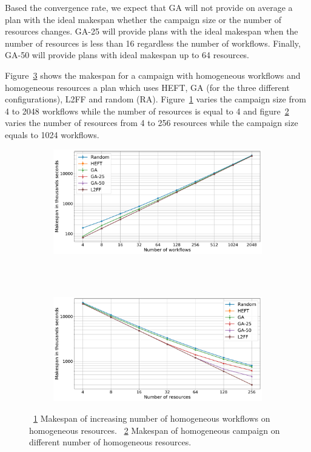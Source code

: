 Based the convergence rate, we expect that GA will not provide on average a plan with the ideal makespan whether the campaign size or the number of resources changes.
GA-25 will provide plans with the ideal makespan when the number of resources is less than 16 regardless the number of workflows.
Finally, GA-50 will provide plans with ideal makespan up to 64 resources.

Figure~\ref{fig:st_homog_analysis} shows the makespan for a campaign with homogeneous workflows and homogeneous resources a plan which uses HEFT, GA (for the three different configurations), L2FF and random (RA).
Figure~\ref{fig:StHomoCampaigns_4StHomoResources} varies the campaign size from 4 to 2048 workflows while the number of resources is equal to 4 and figure~\ref{fig:StHomoResources_StHomoCampaigns} varies the number of resources from 4 to 256 resources while the campaign size equals to 1024 workflows.

\begin{figure}[ht!]
    \centering
    \begin{subfigure}[b]{0.75\textwidth}
        \includegraphics[width=.95\textwidth]{figures/campaign/StHomoCampaigns_4StHomoResources.pdf}
        \caption{}
        \label{fig:StHomoCampaigns_4StHomoResources}
    \end{subfigure}\\
    ~ 
    \begin{subfigure}[b]{0.75\textwidth}
        \includegraphics[width=.95\textwidth]{figures/campaign/StHomoResources_StHomoCampaigns.pdf}
        \caption{}
        \label{fig:StHomoResources_StHomoCampaigns}
    \end{subfigure}
    \caption{~\ref{fig:StHomoCampaigns_4StHomoResources} Makespan of increasing number of homogeneous workflows on homogeneous resources.
    ~\ref{fig:StHomoResources_StHomoCampaigns} Makespan of homogeneous campaign on different number of homogeneous resources.}
    \label{fig:st_homog_analysis}
\end{figure}

